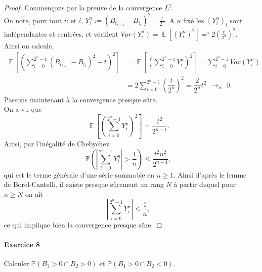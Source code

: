 \documentclass{article}
\theoremstyle{definition}
\numberwithin{equation}{section}
\DeclareMathOperator{\E}{\mathbb{E}}
\begin{document}
\begin{proof}
Commençons par la preuve de la convergence $L^2$.\\
On note, pour tout $n$ et $i$, $Y^n_i:=(B_{t_{i+1}}-B_{t_i})^2-\frac{t}{2^n}$. A $n$ fixé les $(Y_i^n)_i$ sont indépendantes et centrées, et vérifient $Var(Y_i^n)=\E[(Y_i^n)^2]=^\star2(\frac{t}{2^n})^2$. Ainsi on calcule,
\begin{align*}
\E\left[\left( \sum_{i=0}^{2^n-1} (B_{t_{i+1}}-B_{t_i})^2-t \right)^2\right] &= \E\left[ \left( \sum_{i=0}^{2^n-1}Y_i^n \right)^2 \right] = \sum_{i=0}^{2^n-1}Var(Y^n_i)\\
&=2\sum_{i=0}^{2^n-1} \left(\dfrac{t}{2^n}\right)^2 = \dfrac{2}{2^n}t^2 ~~ \longrightarrow_n~~ 0.
\end{align*}
Passons maintenant à la convergence presque sûre.\\
On a vu que 
$$ \E\left[ \left( \sum_{i=0}^{2^n-1}Y_i^n \right)^2 \right] = \dfrac{t^2}{2^{n-1}}. $$
Ainsi, par l'inégalité de Chebychev
$$ \mathbb{P}\left( \left| \sum_{i=0}^{2^n-1} Y_i^n \right| > \dfrac{1}{n} \right) \leq \dfrac{t^2n^2}{2^{n-1}},$$
qui est le terme générale d'une série sommable en $n\geq 1$. Ainsi d'après le lemme de Borel-Cantelli, il existe presque sûrement un rang $N$ à partir duquel pour $n\geq N$ on ait
$$  \left| \sum_{i=0}^{2^n-1} Y_i^n \right| \leq \dfrac{1}{n},$$
ce qui implique bien la convergence presque sûre.
\end{proof}


\paragraph{Exercice 8}
Calculer $\mathbb{P}(B_1>0 \cap B_2>0)$ et $\mathbb{P}(B_1>0 \cap B_2<0)$.
\end{document}
